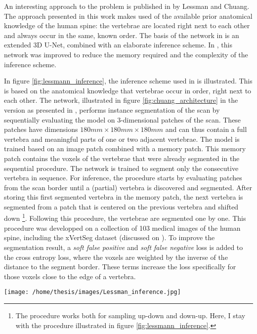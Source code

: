 \par{
    An interesting approach to the problem is published in \cite{Lessmann2018, Chuang2019} by Lessman and Chuang. 
    The approach presented in this work makes used of the available prior anatomical knowledge of the human spine: 
    the vertebrae are located right next to each other and always occur in the same, known order.  
    The basis of the network in \cite{Lessmann2018} is an extended 3D U-Net, combined with an elaborate inference scheme.
    In \cite{Chuang2019}, this network was improved to reduce the memory required and the complexity of the inference scheme.
}
\par{
    In figure \ref{fig:lessmann_inference}, the inference scheme used in \cite{Lessmann2018} is illustrated.
    This is based on the anatomical knowledge that vertebrae occur in order, right next to each other.
    The network, illustrated in figure \ref{fig:chuang_architecture} in the version as presented in \cite{Chuang2019}, 
    performs instance segmentation of the scan by sequentially evaluating the model on 3-dimensional patches of the scan. 
    These patches have dimensions $180mm \times 180mm \times 180mm$ and can thus contain a full vertebra and meaningful parts of one or two adjacent vertebrae.
    The model is trained based on an image patch combined with a memory patch. This memory patch contains the voxels of the vertebrae that were already segmented in the sequential procedure.
    The network is trained to segment only the consecutive vertebra in sequence.
    For inference, the procedure starts by evaluating patches from the scan border until a (partial) vertebra is discovered and segmented.
    After storing this first segmented vertebra in the memory patch, the next vertebra is segmented from a patch that is centered on the previous vertebra and shifted down
    \footnote{The procedure works both for sampling up-down and down-up. Here, I stay with the procedure illustrated in figure \ref{fig:lessmann_inference}.}.
    Following this procedure, the vertebrae are segmented one by one.
    This procedure was developped on a collection of 103 medical images of the human spine, including the xVertSeg dataset (discussed on \pageref{sec:xVertSeg}). 
    To improve the segmentation result, a \textit{soft false positive} and \textit{soft false negative} loss is added to the cross entropy loss, where the voxels are weighted by the inverse of the distance to the segment border. 
    These terms increase the loss specifically for those voxels close to the edge of a vertebra.
}
\begin{SCfigure}[][htb]
    \texttt{[image: /home/thesis/images/Lessman\_inference.jpg]}
    \caption{Illustration of the inference scheme used in \cite{Lessmann2018} (image taken from same). }
    \label{fig:lessmann_inference}
\end{SCfigure}
